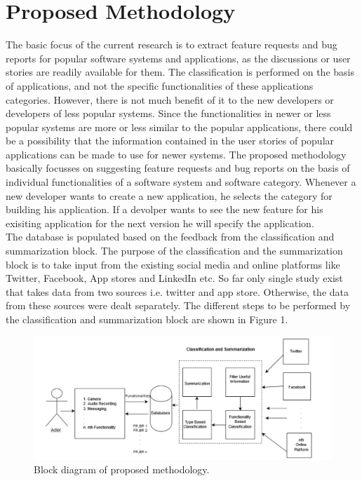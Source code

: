 \section{Proposed Methodology}
The basic focus of the current research is to extract feature requests and bug reports for popular
software systems and applications, as the discussions or user stories are readily available for
them. The classification is performed on the basis of applications, and not the specific
functionalities of these applications categories. However, there is not much benefit of it to the new
developers or developers of less popular systems. Since the functionalities in newer or less popular systems are more or less similar to the popular
applications, there could be a possibility that the information contained in the user stories of
popular applications can be made to use for newer systems. The proposed methodology
basically focusses on suggesting feature requests and bug reports on the basis of individual
functionalities of a software system and software category. Whenever a new developer wants to create a new
application, he selects the category for building his application. If a devolper wants to see the new feature for his exisiting application for the next version he will specify the application.\\

	The database is populated based on the feedback from the classification and summarization
block. The purpose of the classification and the summarization block is to take input from the
existing social media and online platforms like Twitter, Facebook, App stores and LinkedIn etc.
So far only single study \cite{Nayebi} exist that takes data from two sources i.e. twitter and app store.
Otherwise, the data from these sources were dealt separately. The different steps to be
performed by the classification and summarization block are shown in Figure 1.

\begin{figure}
\includegraphics[width=\linewidth]{fig.png}
\caption{Block diagram of proposed methodology.}
\end{figure}

